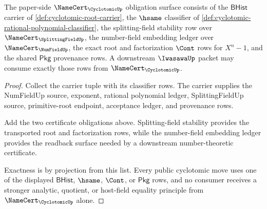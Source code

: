\begin{theorem}
\label{thm:cyclotomic-namecert-obligation-surface}
The paper-side $\NameCert_{\CyclotomicUp}$ obligation surface consists of the $\mathsf{BHist}$ carrier of \autoref{def:cyclotomic-root-carrier}, the $\hsame$ classifier of \autoref{def:cyclotomic-rational-polynomial-classifier}, the splitting-field stability row over $\NameCert_{\SplittingFieldUp}$, the number-field embedding ledger over $\NameCert_{\NumFieldUp}$, the exact root and factorization $\Cont$ rows for $X^n-1$, and the shared $\mathsf{Pkg}$ provenance rows. A downstream $\IwasawaUp$ packet may consume exactly those rows from $\NameCert_{\CyclotomicUp}$.
\end{theorem}
\begin{proof}
Collect the carrier tuple with its classifier rows. The carrier supplies the NumFieldUp source, exponent, rational polynomial ledger, SplittingFieldUp source, primitive-root endpoint, acceptance ledger, and provenance rows.

Add the two certificate obligations above. Splitting-field stability provides the transported root and factorization rows, while the number-field embedding ledger provides the readback surface needed by a downstream number-theoretic certificate.

Exactness is by projection from this list. Every public cyclotomic move uses one of the displayed $\mathsf{BHist}$, $\hsame$, $\Cont$, or $\mathsf{Pkg}$ rows, and no consumer receives a stronger analytic, quotient, or host-field equality principle from $\NameCert_{\CyclotomicUp}$ alone.
\end{proof}

